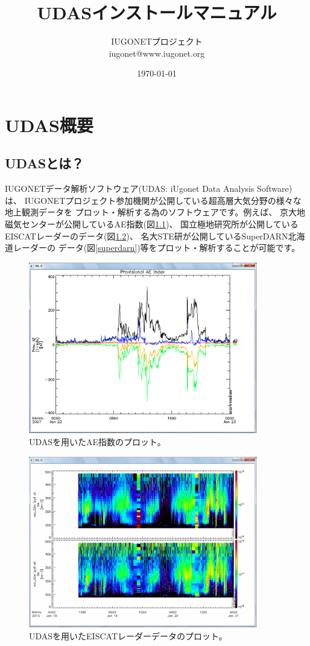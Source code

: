 \documentclass[a4j]{jbook}
\title{UDASインストールマニュアル}
\author{IUGONETプロジェクト\\iugonet@www.iugonet.org}
\date{\today}
\begin{document}
\maketitle
\tableofcontents

\part{UDAS概要}
\label{udas_abstract}
\chapter{UDASとは？}
\label{whats_udas}

IUGONETデータ解析ソフトウェア(UDAS: iUgonet Data Analysis Software)は、
IUGONETプロジェクト参加機関が公開している超高層大気分野の様々な地上観測データを
プロット・解析する為のソフトウェアです。例えば、
京大地磁気センターが公開しているAE指数(図\ref{ae})、
国立極地研究所が公開しているEISCATレーダーのデータ(図\ref{eiscat})、
名大STE研が公開しているSuperDARN北海道レーダーの
データ(図\ref{superdarn})等をプロット・解析することが可能です。
\begin{figure}[H]
\begin{center}
\includegraphics[width=10cm]{images/screenshot_iug_crib_gmag_wdc.eps}
\caption{UDASを用いたAE指数のプロット。}
\label{ae}
\end{center}
\end{figure}

\begin{figure}[H]
\begin{center}
\includegraphics[width=10cm]{images/screenshot_iug_crib_eiscat.eps}
\caption{UDASを用いたEISCATレーダーデータのプロット。}
\label{eiscat}
\end{center}
\end{figure}
\end{document}
